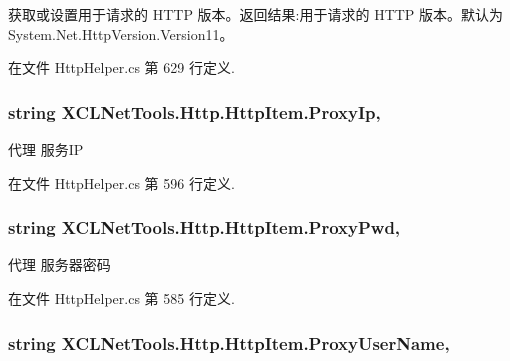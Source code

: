 获取或设置用于请求的 H\-T\-T\-P 版本。返回结果\-:用于请求的 H\-T\-T\-P 版本。默认为 System.\-Net.\-Http\-Version.\-Version11。 



在文件 Http\-Helper.\-cs 第 629 行定义.

\hypertarget{class_x_c_l_net_tools_1_1_http_1_1_http_item_a5069c1ced32908ab2c2e83858ff57d6a}{
\subsubsection[{Proxy\-Ip}]{\setlength{\rightskip}{0pt plus 5cm}string X\-C\-L\-Net\-Tools.\-Http.\-Http\-Item.\-Proxy\-Ip\hspace{0.3cm}{\ttfamily [get]}, {\ttfamily [set]}}}\label{class_x_c_l_net_tools_1_1_http_1_1_http_item_a5069c1ced32908ab2c2e83858ff57d6a}


代理 服务\-I\-P 



在文件 Http\-Helper.\-cs 第 596 行定义.

\hypertarget{class_x_c_l_net_tools_1_1_http_1_1_http_item_ab65bb3daab6ab5ec9ee4ebc74064726a}{
\subsubsection[{Proxy\-Pwd}]{\setlength{\rightskip}{0pt plus 5cm}string X\-C\-L\-Net\-Tools.\-Http.\-Http\-Item.\-Proxy\-Pwd\hspace{0.3cm}{\ttfamily [get]}, {\ttfamily [set]}}}\label{class_x_c_l_net_tools_1_1_http_1_1_http_item_ab65bb3daab6ab5ec9ee4ebc74064726a}


代理 服务器密码 



在文件 Http\-Helper.\-cs 第 585 行定义.

\hypertarget{class_x_c_l_net_tools_1_1_http_1_1_http_item_a7f7b9d839cae3694aced2cbcb3993183}{
\subsubsection[{Proxy\-User\-Name}]{\setlength{\rightskip}{0pt plus 5cm}string X\-C\-L\-Net\-Tools.\-Http.\-Http\-Item.\-Proxy\-User\-Name\hspace{0.3cm}{\ttfamily [get]}, {\ttfamily [set]}}}\label{class_x_c_l_net_tools_1_1_http_1_1_http_item_a7f7b9d839cae3694aced2cbcb3993183}


